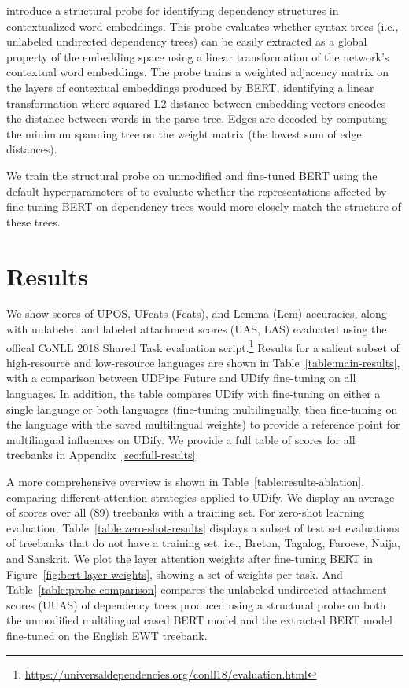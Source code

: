 \documentclass[11pt,a4paper]{article}
\begin{document}
 introduce a structural probe for identifying dependency structures in contextualized word embeddings.
This probe evaluates whether syntax trees (i.e., unlabeled undirected dependency trees) can be easily extracted as a global property of the embedding space using a linear transformation of the network's contextual word embeddings.
The probe trains a weighted adjacency matrix on the layers of contextual embeddings produced by BERT, identifying a linear transformation where squared L2 distance between embedding vectors encodes the distance between words in the parse tree.
Edges are decoded by computing the minimum spanning tree on the weight matrix (the lowest sum of edge distances).

We train the structural probe on unmodified and fine-tuned BERT using the default hyperparameters of  to evaluate whether the representations affected by fine-tuning BERT on dependency trees would more closely match the structure of these trees.

\section{Results}

We show scores of {\sc UPOS}, UFeats ({\sc Feats}), and Lemma ({\sc Lem}) accuracies, along with unlabeled and labeled attachment scores ({\sc UAS}, {\sc LAS}) evaluated using the offical CoNLL 2018 Shared Task evaluation script.\footnote{\url{https://universaldependencies.org/conll18/evaluation.html}}
Results for a salient subset of high-resource and low-resource languages are shown in Table~\ref{table:main-results}, with a comparison between UDPipe Future and UDify fine-tuning on all languages. In addition, the table compares UDify with fine-tuning on either a single language or both languages (fine-tuning multilingually, then fine-tuning on the language with the saved multilingual weights) to provide a reference point for multilingual influences on UDify.
We provide a full table of scores for all treebanks in Appendix~\ref{sec:full-results}.

A more comprehensive overview is shown in Table~\ref{table:results-ablation}, comparing different attention strategies applied to UDify.
We display an average of scores over all (89) treebanks with a training set.
For zero-shot learning evaluation, Table~\ref{table:zero-shot-results} displays a subset of test set evaluations of treebanks that do not have a training set, i.e., Breton, Tagalog, Faroese, Naija, and Sanskrit.
We plot the layer attention weights  after fine-tuning BERT in Figure~\ref{fig:bert-layer-weights}, showing a set of weights per task.
And Table~\ref{table:probe-comparison} compares the unlabeled undirected attachment scores (UUAS) of dependency trees produced using a structural probe on both the unmodified multilingual cased BERT model and the extracted BERT model fine-tuned on the English EWT treebank.
\end{document}
